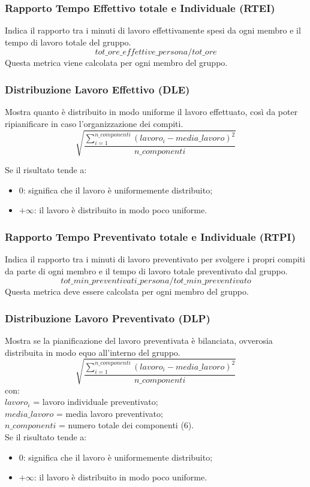 \subsubsection{Rapporto Tempo Effettivo totale e Individuale (RTEI)}
Indica il rapporto tra i minuti di lavoro effettivamente spesi da ogni membro e il tempo di lavoro totale del gruppo. 
\[tot\_ore\_effettive\_persona / tot\_ore
\]
Questa metrica viene calcolata per ogni membro del gruppo.
\subsubsection{Distribuzione Lavoro Effettivo (DLE)}
Mostra quanto è distribuito in modo uniforme il lavoro effettuato, così da poter ripianificare in caso l'organizzazione dei compiti.
\[\sqrt{\frac{\sum_{i=1}^{n\_componenti}(lavoro_i-media\_lavoro)^2}{n\_componenti}}\]

Se il risultato tende a:
\begin{itemize}
    \item 0: significa che il lavoro è uniformemente distribuito;
    \item $+\infty$: il lavoro è distribuito in modo poco uniforme.
\end{itemize}

\subsubsection{Rapporto Tempo Preventivato totale e Individuale (RTPI)}
Indica il rapporto tra i minuti di lavoro preventivato per svolgere i propri compiti da parte di ogni membro e il tempo di lavoro totale preventivato dal gruppo. 
\[tot\_min\_preventivati\_persona / tot\_min\_preventivato\]
Questa metrica deve essere calcolata per ogni membro del gruppo.
\subsubsection{Distribuzione Lavoro Preventivato (DLP)}
Mostra se la pianificazione del lavoro preventivata è bilanciata, ovverosia distribuita in modo equo all'interno del gruppo.
\[\sqrt{\frac{\sum_{i=1}^{n\_componenti}(lavoro_i-media\_lavoro)^2}{n\_componenti}}\]
con:\\
$lavoro_i$ = lavoro individuale preventivato;\\
$media\_lavoro$ = media lavoro preventivato;\\
$n\_componenti$ = numero totale dei componenti (6).
\\Se il risultato tende a:
\begin{itemize}
    \item 0: significa che il lavoro è uniformemente distribuito;
    \item $+\infty$: il lavoro è distribuito in modo poco uniforme.
\end{itemize}
